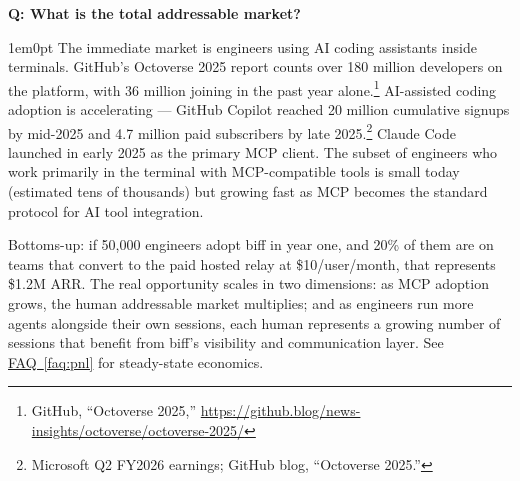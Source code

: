 \documentclass[11pt,letterpaper]{article}
\newcounter{faqnum}
\newenvironment{faqpair}[1]{%
  \needspace{4\baselineskip}%
  \vspace{0.5em}%
  \refstepcounter{faqnum}%
  \noindent\textbf{\color{SectionBlue}Q\thefaqnum: #1}\par\nopagebreak[4]%
  \vspace{0.2em}%
  \begin{adjustwidth}{1em}{0pt}%
  \setlength{\parindent}{0pt}%
}{%
  \end{adjustwidth}%
  \vspace{0.5em}%
}
\newcommand{\faqref}[1]{\hyperref[#1]{FAQ~\ref*{#1}}}
\begin{document}
\begin{faqpair}{What is the total addressable market?}\label{faq:tam}
  The immediate market is engineers using AI coding assistants inside
  terminals. GitHub's Octoverse 2025 report counts over 180 million
  developers on the platform, with 36 million joining in the past year
  alone.\footnote{GitHub, ``Octoverse 2025,''
  \url{https://github.blog/news-insights/octoverse/octoverse-2025/}}
  AI-assisted coding adoption is accelerating --- GitHub Copilot reached
  20 million cumulative signups by mid-2025 and 4.7 million paid
  subscribers by late 2025.\footnote{Microsoft Q2 FY2026 earnings;
  GitHub blog, ``Octoverse 2025.''} Claude Code launched in early 2025
  as the primary MCP client. The subset of engineers who
  work primarily in the terminal with MCP-compatible tools is small today
  (estimated tens of thousands) but growing fast as MCP becomes the
  standard protocol for AI tool integration.

  Bottoms-up: if 50,000 engineers adopt biff in year one, and 20\% of them
  are on teams that convert to the paid hosted relay at \$10/user/month,
  that represents \$1.2M ARR. The real opportunity scales in two
  dimensions: as MCP adoption grows, the human addressable market
  multiplies; and as engineers run more agents alongside their own
  sessions, each human represents a growing number of sessions that benefit
  from biff's visibility and communication layer.
  See \faqref{faq:pnl} for steady-state economics.
\end{faqpair}
\end{document}
